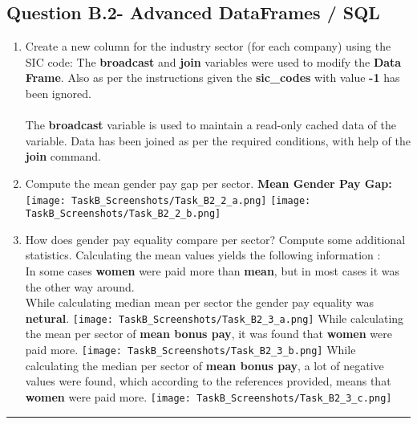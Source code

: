 \documentclass[12pt]{article}
\begin{document}
\subsection{Question B.2- Advanced DataFrames / SQL}
\begin{enumerate}
\item  Create a new column for the industry sector (for each company) using the SIC code:
\newline
\newline
	The \textbf{broadcast} and \textbf{join} variables were used to modify the \textbf{Data Frame}. Also as per the instructions given the \textbf{sic\_codes} with value \textbf{-1} has been ignored. \\
	\\
	The \textbf{broadcast} variable is used to maintain a read-only cached data of the variable. Data has been joined as per the required conditions, with help of the \textbf{join} command. \cite{BC}
\item Compute the mean gender pay gap per sector.
\newline
\newline
	\textbf{Mean Gender Pay Gap:}
    \newline
    \texttt{[image: TaskB\_Screenshots/Task\_B2\_2\_a.png]}
	\newline
	\newline
	\texttt{[image: TaskB\_Screenshots/Task\_B2\_2\_b.png]}
\item How does gender pay equality compare per sector? Compute some additional statistics.
\newline
\newline
	Calculating the mean values yields the following information : \\
    \newline
    In some cases \textbf{women} were paid more than \textbf{mean}, but in most cases it was the other way around. \\
    \newline
    While calculating median mean per sector the gender pay equality was \textbf{netural}.
    \newline
	\texttt{[image: TaskB\_Screenshots/Task\_B2\_3\_a.png]}
    \newline
    \newline
    While calculating the mean per sector of \textbf{mean bonus pay}, it was found that \textbf{women} were paid more.
    \newline
    \texttt{[image: TaskB\_Screenshots/Task\_B2\_3\_b.png]}
    \newline
    \newline
    While calculating the median per sector of \textbf{mean bonus pay}, a lot of negative values were found, which according to the references provided, means that \textbf{women} were paid more. \cite{GPGS}
    \newline
    \texttt{[image: TaskB\_Screenshots/Task\_B2\_3\_c.png]}
\end{enumerate}
\hrule
\newpage
\end{document}
